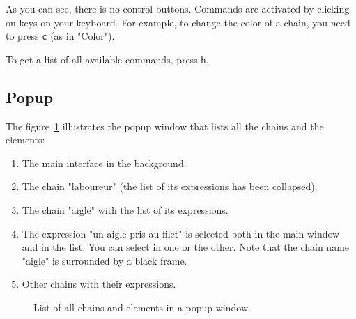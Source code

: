 \documentclass[12pt]{article}
\begin{document}
As you can see, there is no control buttons.  Commands are activated by
clicking on keys on your keyboard.  For example, to change the color of a
chain, you need to press \verb|c| (as in "Color").

To get a list of all available commands, press \verb|h|.


 \subsection{Popup}

The figure~\ref{fig:popup-at-a-glance} illustrates the popup window that lists
all the chains and the elements:
\begin{enumerate}
   \item The main interface in the background.
   \item The chain "laboureur" (the list of its expressions has been
   collapsed).
   \item The chain "aigle" with the list of its expressions.
   \item The expression "un aigle pris au filet" is selected both in the main
   window and in the list.  You can select in one or the other.  Note that the
   chain name "aigle" is surrounded by a black frame.
   \item Other chains with their expressions.
\end{enumerate}

\begin{figure}
\begin{center}
{%
\setlength{\fboxsep}{0pt}%
}
\end{center}
\caption{List of all chains and elements in a popup window.}
\label{fig:popup-at-a-glance}
\end{figure}
\end{document}
